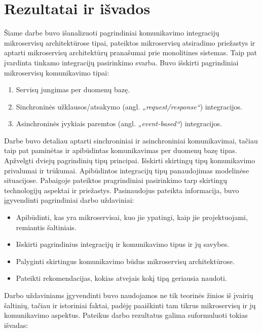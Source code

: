 \section{Rezultatai ir išvados}

Šiame darbe buvo išanalizuoti pagrindiniai komunikavimo integracijų mikroservisų architektūrose tipai, pateiktos mikroservisų
atsiradimo priežastys ir aptarti mikroservisų architektūrų pranašumai prie monolitines sistemas. Taip pat įvardinta tinkamo integracijų 
pasirinkimo svarba. Buvo išskirti pagrindiniai mikroservisų komunikavimo tipai:

\begin{enumerate}
	\item Servisų jungimas per duomenų bazę.
	\item Sinchroninės užklausos/atsakymo (angl. \textit{„request/response“}) integracijos.
	\item Asinchroninės įvykiais paremtos (angl. \textit{„event-based“}) integracijos.
\end{enumerate}

Darbe buvo detaliau aptarti sinchroniniai ir asinchroniniai komunikavimai, tačiau taip pat
paminėtas ir apibūdintas komunikavimas per duomenų bazę tipas.
Apžvelgti dviejų pagrindinių tipų principai. Išskirti skirtingų tipų komunikavimo privalumai ir trūkumai.
Apibūdintos integracijų tipų panaudojimas modelinėse situacijose. Pabaigoje pateiktos pragrindiniai pasirinkimo tarp skirtingų technologijų
aspektai ir priežastys.
\break
Pasinaudojus pateikta informacija, buvo įgyvendinti pagrindiniai darbo uždaviniai:

\begin{itemize}
	\item Apibūdinti, kas yra mikroservisai, kuo jie ypatingi, kaip jie projektuojami, remiantis šaltiniais.
	\item Išskirti pagrindinius integracijų ir komunikavimo tipus ir jų savybes.
	\item Palyginti skirtingus komunikavimo būdus mikroservisų architektūrose.
	\item Pateikti rekomendacijas, kokias atvejais kokį tipą geriausia naudoti.
\end{itemize}

Darbo uždaviniams įgyvendinti buvo naudojamos ne tik teorinės žinios iš įvairių šaltinių, tačiau ir istoriniai faktai, 
padėję paaiškinti tam tikrus mikroservisų ir jų komunikavimo aspektus.
\break
Pateikus darbo rezultatus galima suformuluoti tokias išvadas:

